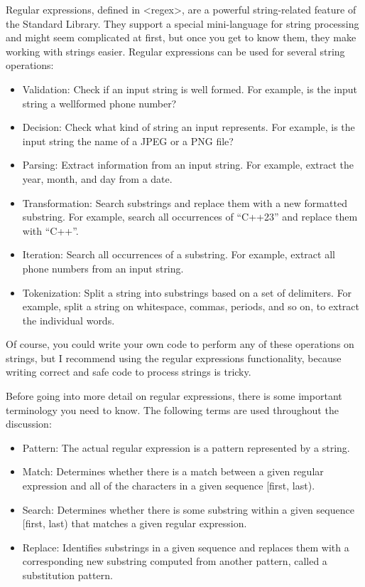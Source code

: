 
Regular expressions, defined in <regex>, are a powerful string-related feature of the Standard Library. They support a special mini-language for string processing and might seem complicated at first, but once you get to know them, they make working with strings easier. Regular expressions can be used for several string operations:

\begin{itemize}
\item
Validation: Check if an input string is well formed. For example, is the input string a wellformed phone number?

\item
Decision: Check what kind of string an input represents. For example, is the input string the name of a JPEG or a PNG file?

\item
Parsing: Extract information from an input string. For example, extract the year, month, and day from a date.

\item
Transformation: Search substrings and replace them with a new formatted substring. For example, search all occurrences of “C++23” and replace them with “C++”.

\item
Iteration: Search all occurrences of a substring. For example, extract all phone numbers from an input string.

\item
Tokenization: Split a string into substrings based on a set of delimiters. For example, split a string on whitespace, commas, periods, and so on, to extract the individual words.
\end{itemize}

Of course, you could write your own code to perform any of these operations on strings, but I recommend using the regular expressions functionality, because writing correct and safe code to process strings is tricky.

Before going into more detail on regular expressions, there is some important terminology you need to know. The following terms are used throughout the discussion:

\begin{itemize}
\item
Pattern: The actual regular expression is a pattern represented by a string.

\item
Match: Determines whether there is a match between a given regular expression and all of the characters in a given sequence [first, last).

\item
Search: Determines whether there is some substring within a given sequence [first, last) that matches a given regular expression.

\item
Replace: Identifies substrings in a given sequence and replaces them with a corresponding new substring computed from another pattern, called a substitution pattern.
\end{itemize}

